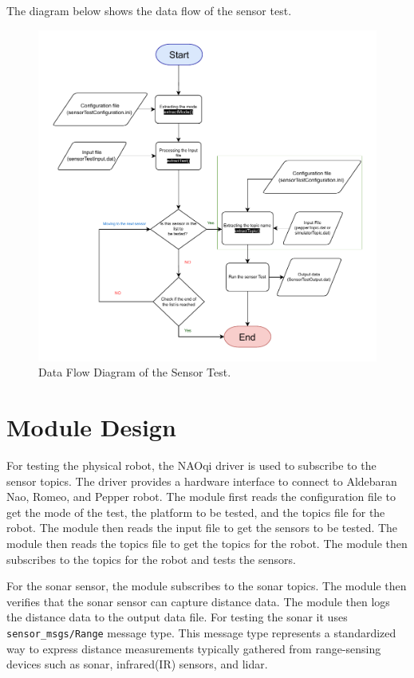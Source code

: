 \documentclass{CSSRforAfrica}
\begin{document}
The diagram below shows the data flow of the sensor test.
\begin{figure}[!hbpt]
	\centering
	\includegraphics[scale=1.0]{images/Sensor_diagram.pdf}
	\caption{Data Flow Diagram of the Sensor Test.}
	\label{fig: Sensor Test Flow diagram}
\end{figure}

\newpage

\section{Module Design}
For testing the physical robot, the NAOqi driver is used to subscribe to the sensor topics. The  driver provides a hardware interface to connect to 
Aldebaran Nao, Romeo, and Pepper robot. The module first reads the configuration file to get the mode of the test, the platform to be tested, 
and the topics file for the robot. The module then reads the input file to get the sensors to be tested. The module then reads the topics file to get the
topics for the robot. The module then subscribes to the topics for the robot and tests the sensors. 

For the sonar sensor, the module subscribes to the sonar topics. The module then verifies that the sonar sensor can capture distance data. The 
module then logs the distance data to the output data file. For testing the sonar it uses \texttt{sensor\_msgs/Range} message type. This message type 
represents a standardized way to express distance measurements typically gathered from range-sensing devices such as sonar, infrared(IR) sensors, and lidar. 
\end{document}
